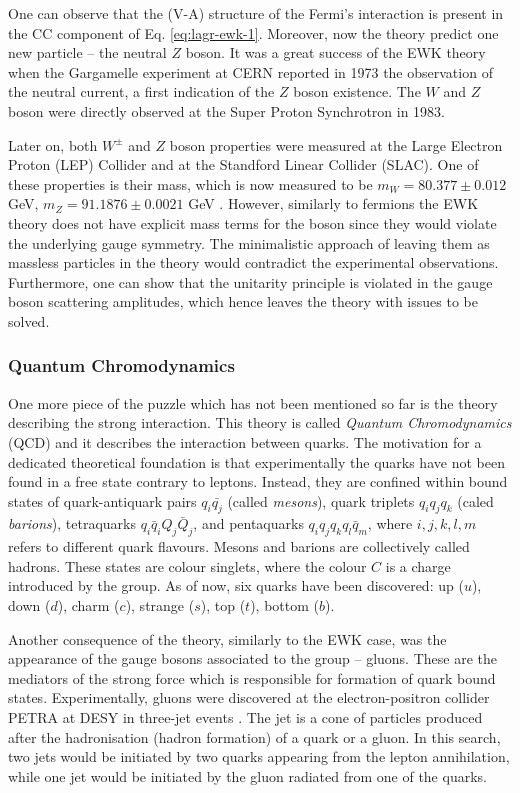 One can observe that the (V-A) structure of the Fermi's interaction is present in the CC component of Eq. \ref{eq:lagr-ewk-1}. Moreover, now the theory predict one new particle -- the neutral $Z$ boson. It was a great success of the EWK theory when the Gargamelle experiment at CERN reported in 1973 the observation of the neutral current, a first indication of the $Z$ boson existence. The $W$ and $Z$ boson were directly observed at the Super Proton Synchrotron in 1983.   

Later on, both $W^\pm$ and $Z$ boson properties were measured at the Large Electron Proton (LEP) Collider and  at the Standford Linear Collider (SLAC). One of these properties is their mass, which is now measured to be $m_W = 80.377 \pm 0.012$ GeV, $m_Z = 91.1876 \pm 0.0021$ GeV \cite{ParticleDataGroup:2020ssz}. However, similarly to fermions the EWK theory does not have explicit mass terms for the boson since they would violate the underlying gauge symmetry. The minimalistic approach of leaving them as massless particles in the theory would contradict the experimental observations. Furthermore, one can show that the unitarity principle is violated in the gauge boson scattering amplitudes, which hence leaves the theory with issues to be solved.   

\subsubsection{Quantum Chromodynamics}

One more piece of the puzzle which has not been mentioned so far is the theory describing the strong interaction. This theory is called \textit{Quantum Chromodynamics} (QCD) and it describes the interaction between quarks. The motivation for a dedicated theoretical foundation is that experimentally the quarks have not been found in a free state contrary to leptons. Instead, they are confined within bound states of quark-antiquark pairs $q_i\bar{q_j}$ (called \textit{mesons}), quark triplets $q_iq_jq_k$ (caled \textit{barions}), tetraquarks $q_i\bar{q}_iQ_j\bar{Q}_j$, and pentaquarks $q_iq_jq_kq_l\bar{q}_m$, where $i,j,k,l,m$ refers to different quark flavours. Mesons and barions are collectively called hadrons. These states are colour singlets, where the colour $C$ is a charge introduced by the \suthr group. As of now, six quarks have been discovered: up ($u$), down ($d$), charm ($c$), strange ($s$), top ($t$), bottom ($b$).

Another consequence of the theory, similarly to the EWK case, was the appearance of the gauge bosons associated to the group -- gluons. These are the mediators of the strong force which is responsible for formation of quark bound states. Experimentally, gluons were discovered at the electron-positron collider PETRA at DESY in three-jet events \cite{Barber:1979yr}. The jet is a cone of particles produced after the hadronisation (hadron formation) of a quark or a gluon. In this search, two jets would be initiated by two quarks appearing from the lepton annihilation, while one jet would be initiated by the gluon radiated from one of the quarks.  


